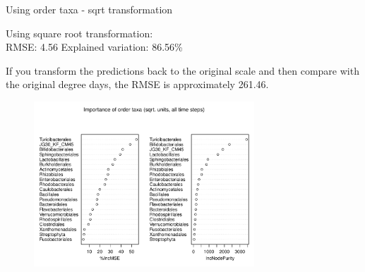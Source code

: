 \documentclass{beamer}
\begin{document}
\begin{frame}{Using order taxa - sqrt transformation}

  {\scriptsize
    
  \noindent Using square root transformation:\\
  RMSE: 4.56  \hspace{0.05in}  Explained variation: 86.56\%

  \vspace{0.05in}
  
  \noindent If you transform the predictions back to the original
  scale and then compare with the original degree days, the RMSE is
  approximately 261.46.
  
\begin{center}
\begin{figure}
  \includegraphics[width=3.25in]{../only_orders/all_time_steps/sqrt_units_all_data_orders_imp_plot}
\end{figure}
\end{center}
\vspace{-0.25in}
}
  
\end{frame}
\end{document}
